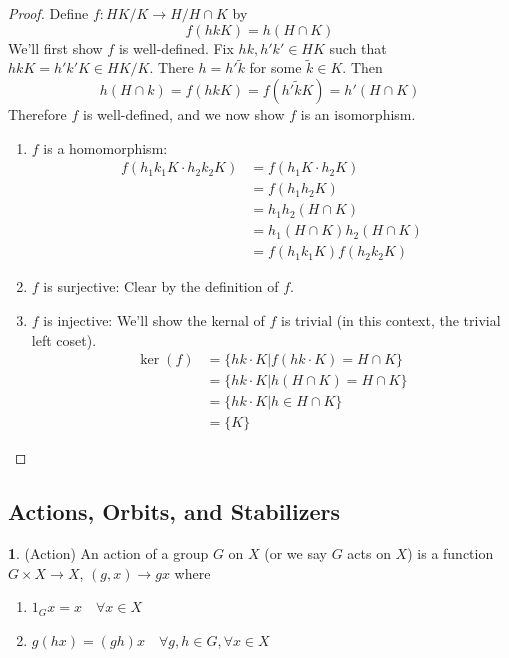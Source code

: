 \documentclass[12pt]{article}
\theoremstyle{definition}
\newtheorem{definition}{\color{NavyBlue}{\textbf{Definition}}}
\theoremstyle{definition}
\begin{document}
\begin{proof}
Define $f : HK / K \to H / H \cap K$ by 
\begin{equation}
	f(hk K) = h (H \cap K)
\end{equation}
We'll first show $f$ is well-defined. Fix $hk, h'k' \in HK$ such that $hk K = h'k'K \in HK/K$. There $h = h'\tilde{k}$ for some $\tilde{k} \in K$. Then
\begin{equation}
	h (H \cap k) = f(hk K) = f(h' \tilde{k} K) = h' (H \cap K)
\end{equation}
Therefore $f$ is well-defined, and we now show $f$ is an isomorphism.
\begin{enumerate}
	\item $f$ is a homomorphism:
	\begin{align*}
	f(h_1 k_1 K \cdot h_2 k_2 K) &= f(h_1 K \cdot h_2 K) \\
	&= f(h_1h_2 K) \\
	&= h_1h_2 (H \cap K) \\
	&= h_1 (H \cap K) h_2 (H \cap K) \\
	&= f(h_1 k_1 K) f(h_2 k_2 K)
	\end{align*}
	\item $f$ is surjective: Clear by the definition of $f$. 
	\item $f$ is injective: We'll show the kernal of $f$ is trivial (in this context, the trivial left coset). 
	\begin{align*}
		\ker(f) &= \{ hk \cdot K | f(hk \cdot K) = H \cap K \} \\
		&= \{ hk \cdot K | h (H \cap K) = H \cap K \} \\
		&= \{ hk \cdot K | h \in H \cap K \} \tag{$h (H\cap K) = H \cap K \iff h \in H\cap K$} \\
		&= \{K \}
	\end{align*}
\end{enumerate}
\end{proof}

\subsection{Actions, Orbits, and Stabilizers}
\begin{definition}(Action)
An action of a group $G$ on $X$ (or we say $G$ acts on $X$) is a function $G \times X \to X$, $(g,x) \to gx$ where
\begin{enumerate}
	\item $1_G x = x \quad \forall x \in X$ 
	\item $g(hx) = (gh)x \quad \forall g,h \in G, \forall x \in X$
\end{enumerate}
\end{definition}
\end{document}
